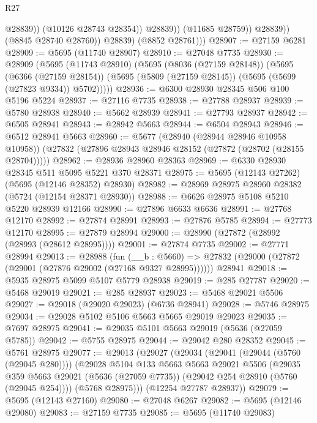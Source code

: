 \begin{lexlean}{R27}
\begin{coremodule}
                            @28839))
                        (@10126 @28743 @28354))
                      @28839))
                  (@11685 @28759))
                @28839))
            (@8845 @28740 @28760))
          @28839)
        (@8852 @28761)))
@28907 := @27159 @6281
@28909 := @5695 (@11740 @28907)
@28910 := @27048 @7735
@28930 := @28909
    (@5695
      (@11743 @28910)
      (@5695
        (@8036 (@27159 @28148))
        (@5695
          (@6366 (@27159 @28154))
          (@5695 (@5809 (@27159 @28145)) (@5695 (@5699 (@27823 @9334)) @5702)))))
@28936 := @6300 @28930 @28345 @506 @100 @5196 @5224
@28937 := @27116 @7735
@28938 := @27788 @28937
@28939 := @5780 @28938
@28940 := @5662 @28939
@28941 := @27793 @28937
@28942 := @6505 @28941
@28943 := @28942 @5663
@28944 := @6504 @28943
@28946 := @6512 @28941 @5663
@28960 := @5677
    (@28940 (@28944 @28946 @10958 @10958))
    (@27832 (@27896 @28943 @28946 @28152 (@27872 (@28702 (@28155 @28704)))))
@28962 := @28936 @28960 @28363
@28969 := @6330 @28930 @28345 @511 @5095 @5221 @370 @28371
@28975 := @5695 (@12143 @27262) (@5695 (@12146 @28352) @28930)
@28982 := @28969 @28975 @28960 @28382 (@5724 (@12154 @28371 @28930))
@28988 := @6626 @28975 @5108 @5210 @5220 @28939 @12166
@28990 := @27896 @6633 @6636
@28991 := @27768 @12170
@28992 := @27874 @28991
@28993 := @27876 @5785
@28994 := @27773 @12170
@28995 := @27879 @28994
@29000 := @28990 (@27872 (@28992 (@28993 (@28612 @28995))))
@29001 := @27874 @7735
@29002 := @27771 @28994
@29013 := @28988
    (fun (__b : @5660) => @27832 (@29000 (@27872 (@29001 (@27876 @29002 (@27168 @9327 @28995))))))
    @28941
@29018 := @5935 @28975 @5099 @5107 @5779 @28938
@29019 := @285 @27787
@29020 := @5468 @29019
@29021 := @285 @28937
@29023 := @5468 @29021 @5506
@29027 := @29018 (@29020 @29023) (@6736 @28941)
@29028 := @5746 @28975
@29034 := @29028 @5102 @5106 @5663 @5665 @29019 @29023
@29035 := @7697 @28975
@29041 := @29035 @5101 @5663 @29019 (@5636 (@27059 @5785))
@29042 := @5755 @28975
@29044 := @29042 @280 @28352
@29045 := @5761 @28975
@29077 := @29013
    (@29027
      (@29034
        (@29041 (@29044 (@5760 (@29045 @280))))
        (@29028
          @5104
          @133
          @5663
          @5663
          @29021
          @5506
          (@29035
            @359
            @5663
            @29021
            (@5636 (@27059 @7735))
            (@29042 @254 @28910 (@5760 (@29045 @254))))
          (@5768 @28975)))
      (@12254 @27787 @28937))
@29079 := @5695 (@12143 @27160)
@29080 := @27048 @6267
@29082 := @5695 (@12146 @29080)
@29083 := @27159 @7735
@29085 := @5695 (@11740 @29083)

\end{coremodule}
\end{lexlean}
